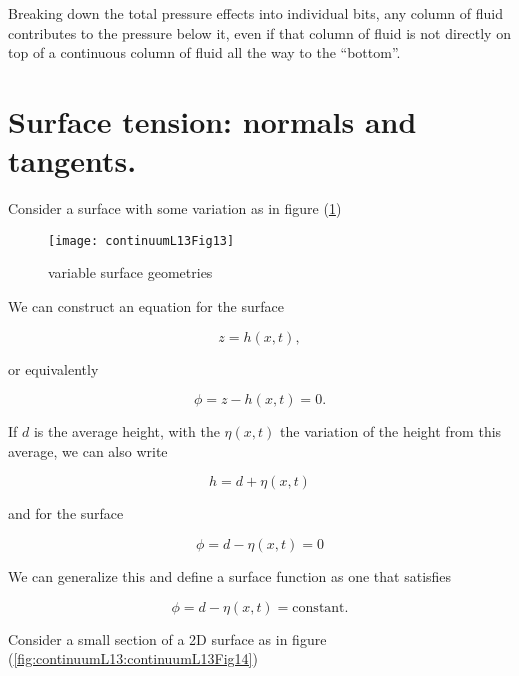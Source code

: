 Breaking down the total pressure effects into individual bits, any column of fluid contributes to the pressure below it, even if that column of fluid is not directly on top of a continuous column of fluid all the way to the ``bottom''.

\section{Surface tension: normals and tangents.}

Consider a surface with some variation as in figure (\ref{fig:continuumL13:continuumL13Fig13})

\begin{figure}[htp]
   \centering
   \texttt{[image: continuumL13Fig13]}
   \caption{variable surface geometries}\label{fig:continuumL13:continuumL13Fig13}
\end{figure}

We can construct an equation for the surface

\begin{equation}\label{eqn:continuumL13:160}
z = h(x, t),
\end{equation}

or equivalently

\begin{equation}\label{eqn:continuumL13:180}
\phi = z - h(x, t) = 0.
\end{equation}

If $d$ is the average height, with the $\eta(x,t)$ the variation of the height from this average, we can also write

\begin{equation}\label{eqn:continuumL13:200}
h = d + \eta(x, t)
\end{equation}

and for the surface

\begin{equation}\label{eqn:continuumL13:220}
\phi = d - \eta(x, t) = 0
\end{equation}

We can generalize this and define a surface function as one that satisfies

\begin{equation}\label{eqn:continuumL13:220b}
\phi = d - \eta(x, t) = \text{constant}.
\end{equation}

Consider a small section of a 2D surface as in figure (\ref{fig:continuumL13:continuumL13Fig14})

